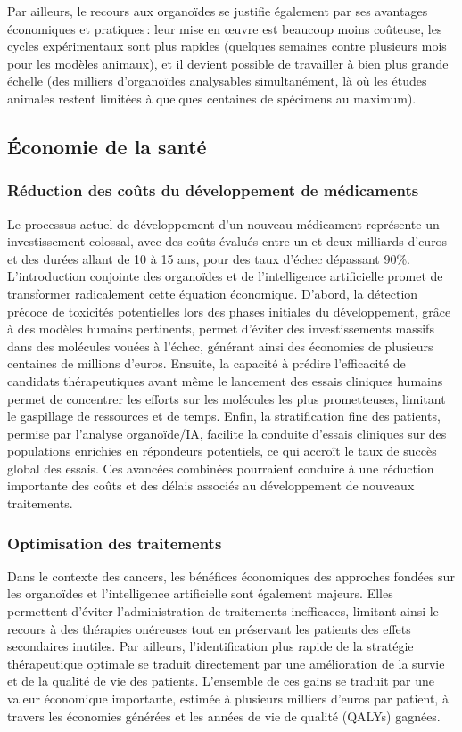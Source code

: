 Par ailleurs, le recours aux organoïdes se justifie également par ses avantages économiques et pratiques : leur mise en œuvre est beaucoup moins coûteuse, les cycles expérimentaux sont plus rapides (quelques semaines contre plusieurs mois pour les modèles animaux), et il devient possible de travailler à bien plus grande échelle (des milliers d’organoïdes analysables simultanément, là où les études animales restent limitées à quelques centaines de spécimens au maximum).

\subsection{Économie de la santé}

\subsubsection{Réduction des coûts du développement de médicaments}

Le processus actuel de développement d’un nouveau médicament représente un investissement colossal, avec des coûts évalués entre un et deux milliards d'euros et des durées allant de 10 à 15 ans, pour des taux d'échec dépassant 90\%. L’introduction conjointe des organoïdes et de l’intelligence artificielle promet de transformer radicalement cette équation économique. D’abord, la détection précoce de toxicités potentielles lors des phases initiales du développement, grâce à des modèles humains pertinents, permet d’éviter des investissements massifs dans des molécules vouées à l’échec, générant ainsi des économies de plusieurs centaines de millions d’euros. Ensuite, la capacité à prédire l’efficacité de candidats thérapeutiques avant même le lancement des essais cliniques humains permet de concentrer les efforts sur les molécules les plus prometteuses, limitant le gaspillage de ressources et de temps. Enfin, la stratification fine des patients, permise par l’analyse organoïde/IA, facilite la conduite d’essais cliniques sur des populations enrichies en répondeurs potentiels, ce qui accroît le taux de succès global des essais. Ces avancées combinées pourraient conduire à une réduction importante des coûts et des délais associés au développement de nouveaux traitements.

\subsubsection{Optimisation des traitements}

Dans le contexte des cancers, les bénéfices économiques des approches fondées sur les organoïdes et l’intelligence artificielle sont également majeurs. Elles permettent d’éviter l’administration de traitements inefficaces, limitant ainsi le recours à des thérapies onéreuses tout en préservant les patients des effets secondaires inutiles. Par ailleurs, l’identification plus rapide de la stratégie thérapeutique optimale se traduit directement par une amélioration de la survie et de la qualité de vie des patients. L’ensemble de ces gains se traduit par une valeur économique importante, estimée à plusieurs milliers d’euros par patient, à travers les économies générées et les années de vie de qualité (QALYs) gagnées.


